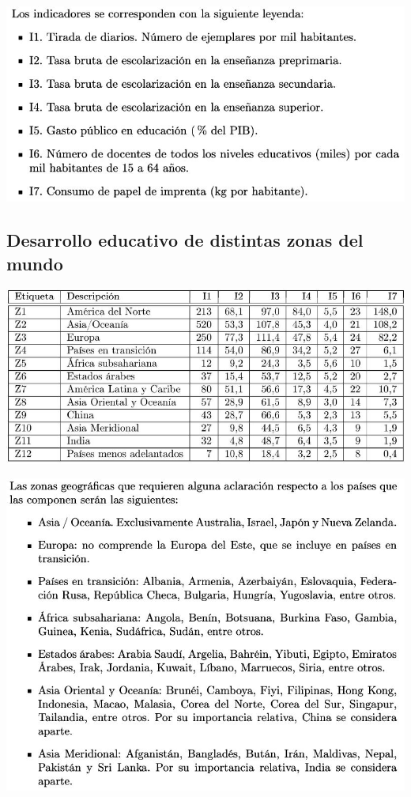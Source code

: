 \documentclass[]{article}
\begin{document}
\hypertarget{right}{}
\includegraphics[width=1\linewidth]{images/indi}

\subsection{Desarrollo educativo de distintas zonas del
mundo}\label{desarrollo-educativo-de-distintas-zonas-del-mundo-2}

\hypertarget{left}{}
\includegraphics[width=1\linewidth]{images/cuadro}

\hypertarget{right}{}
\includegraphics[width=1\linewidth]{images/geogra}
\end{document}
